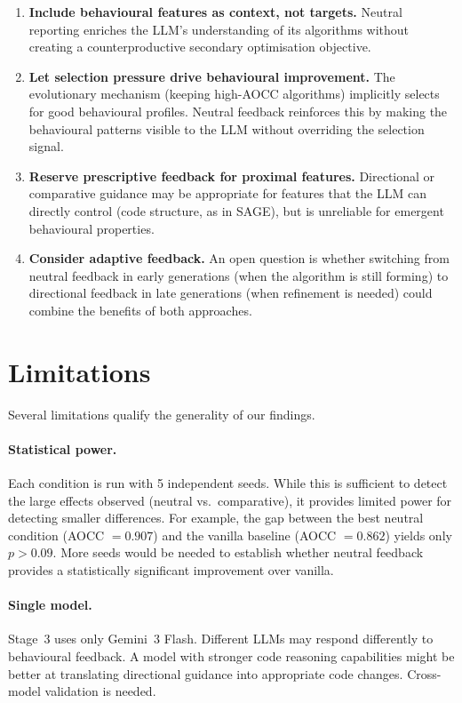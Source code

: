 \begin{enumerate}
  \item \textbf{Include behavioural features as context, not targets.} Neutral reporting enriches the LLM's understanding of its algorithms without creating a counterproductive secondary optimisation objective.
  \item \textbf{Let selection pressure drive behavioural improvement.} The evolutionary mechanism (keeping high-AOCC algorithms) implicitly selects for good behavioural profiles. Neutral feedback reinforces this by making the behavioural patterns visible to the LLM without overriding the selection signal.
  \item \textbf{Reserve prescriptive feedback for proximal features.} Directional or comparative guidance may be appropriate for features that the LLM can directly control (code structure, as in SAGE), but is unreliable for emergent behavioural properties.
  \item \textbf{Consider adaptive feedback.} An open question is whether switching from neutral feedback in early generations (when the algorithm is still forming) to directional feedback in late generations (when refinement is needed) could combine the benefits of both approaches.
\end{enumerate}

\section{Limitations}
\label{sec:disc-limitations}

Several limitations qualify the generality of our findings.

\paragraph{Statistical power.}
Each condition is run with 5 independent seeds. While this is sufficient to detect the large effects observed (neutral vs.\ comparative), it provides limited power for detecting smaller differences. For example, the gap between the best neutral condition (AOCC $= 0.907$) and the vanilla baseline (AOCC $= 0.862$) yields only $p > 0.09$. More seeds would be needed to establish whether neutral feedback provides a statistically significant improvement over vanilla.

\paragraph{Single model.}
Stage~3 uses only Gemini~3 Flash. Different LLMs may respond differently to behavioural feedback. A model with stronger code reasoning capabilities might be better at translating directional guidance into appropriate code changes. Cross-model validation is needed.


